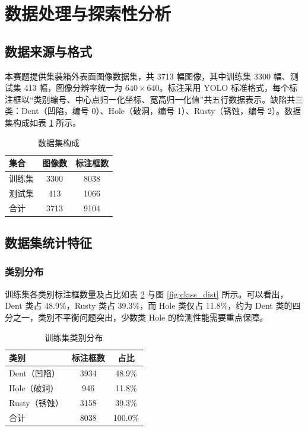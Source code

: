 \section{数据处理与探索性分析}

\subsection{数据来源与格式}

本赛题提供集装箱外表面图像数据集，共 3713 幅图像，其中训练集 3300 幅、测试集 413 幅，图像分辨率统一为 $640\times640$。标注采用 YOLO 标准格式，每个标注框以“类别编号、中心点归一化坐标、宽高归一化值”共五行数据表示。缺陷共三类：Dent（凹陷，编号 0）、Hole（破洞，编号 1）、Rusty（锈蚀，编号 2）。数据集构成如表 \ref{tab:dataset} 所示。

\begin{table}[H]
\centering
{}
\caption{数据集构成}\label{tab:dataset}
\begin{tabular}{lcc}
  \toprule
  集合 & 图像数 & 标注框数 \\
  \midrule
  训练集 & 3300 & 8038 \\
  测试集 & 413 & 1066 \\
  \midrule
  合计 & 3713 & 9104 \\
  \bottomrule
\end{tabular}
\end{table}

\subsection{数据集统计特征}

\subsubsection{类别分布}

训练集各类别标注框数量及占比如表 \ref{tab:class_dist} 与图 \ref{fig:class_dist} 所示。可以看出，Dent 类占 48.9\%，Rusty 类占 39.3\%，而 Hole 类仅占 11.8\%，约为 Dent 类的四分之一，类别不平衡问题突出，少数类 Hole 的检测性能需要重点保障。

\begin{table}[H]
\centering
{}
\caption{训练集类别分布}\label{tab:class_dist}
\begin{tabular}{lcc}
  \toprule
  类别 & 标注框数 & 占比 \\
  \midrule
  Dent（凹陷） & 3934 & 48.9\% \\
  Hole（破洞） & 946 & 11.8\% \\
  Rusty（锈蚀） & 3158 & 39.3\% \\
  \midrule
  合计 & 8038 & 100.0\% \\
  \bottomrule
\end{tabular}
\end{table}

